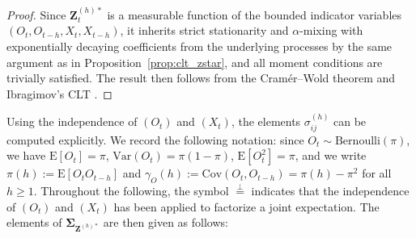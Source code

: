 ﻿\documentclass[12pt,a4paper]{scrreprt}
\theoremstyle{definition}
\begin{document}
\begin{proof}
Since $\boldsymbol{Z}^{(h)*}_t$ is a measurable function of the bounded 
indicator variables $(O_t, O_{t-h}, \allowbreak X_t, X_{t-h})$, it inherits strict 
stationarity and $\alpha$-mixing with exponentially decaying coefficients 
from the underlying processes by the same argument as in 
Proposition~\ref{prop:clt_zstar}, and all moment conditions are trivially satisfied. 
The result then follows from the Cramér--Wold theorem 
\citep[Corollary~4.5]{kallenberg_2021} and Ibragimov's CLT 
\citep[Theorem~7]{Ibragimov1962}.
\end{proof}

\noindent Using the independence of $(O_t)$ and $(X_t)$, the elements 
$\sigma^{(h)}_{ij}$ can be computed explicitly. We record the 
following notation: since $O_t \sim \mathrm{Bernoulli}(\pi)$, we have $\mathrm{E}[O_t] = \pi$, 
$\mathrm{Var}(O_t) = \pi(1-\pi)$, $\mathrm{E}[O_t^2] = \pi$, and 
we write $\pi(h) := \mathrm{E}[O_tO_{t-h}]$ and 
$\gamma_O(h) := \mathrm{Cov}(O_t, O_{t-h}) = \pi(h) - \pi^2$ 
for all $h \geq 1$. Throughout the following, the symbol 
$\overset{\perp}{=}$ indicates that the independence of $(O_t)$ 
and $(X_t)$ has been applied to factorize a joint expectation. The elements of $\boldsymbol{\Sigma}_{\boldsymbol{Z}^{(h)*}}$ 
are then given as follows:
 \label{cal:Sigma_Zh}
\end{document}
